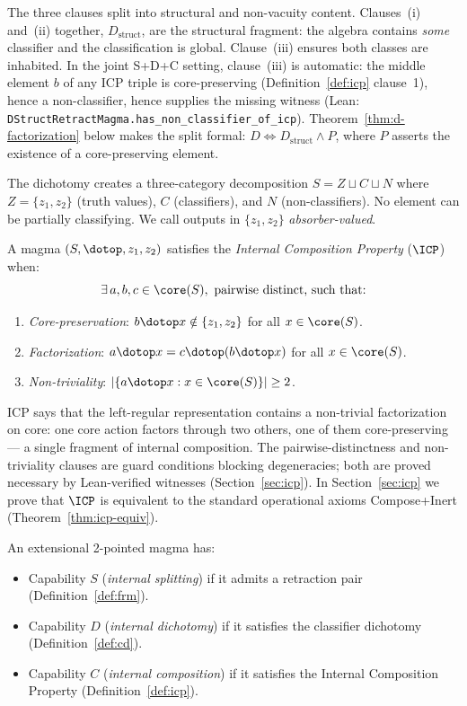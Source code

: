 The three clauses split into structural and non-vacuity content.
Clauses~(i) and~(ii) together, $D_{\mathrm{struct}}$, are the structural
fragment: the algebra contains \emph{some} classifier and the
classification is global. Clause~(iii) ensures both classes are
inhabited. In the joint S+D+C setting, clause~(iii) is automatic: the
middle element $b$ of any ICP triple is core-preserving (Definition~\ref{def:icp}
clause~1), hence a non-classifier, hence supplies the missing witness
(Lean: \texttt{DStructRetractMagma.has\_non\_classifier\_of\_icp}).
Theorem~\ref{thm:d-factorization} below makes the split formal:
$D \iff D_{\mathrm{struct}} \wedge P$, where $P$ asserts the existence
of a core-preserving element.

The dichotomy creates a three-category decomposition
$S = Z \sqcup C \sqcup N$ where $Z = \{z_1, z_2\}$ (truth values),
$C$ (classifiers), and $N$ (non-classifiers). No element can be partially
classifying. We call outputs in $\{z_1, z_2\}$ \emph{absorber-valued}.

\begin{definition}
\label{def:icp}
A magma $(S, \dotop, z_1, z_2)$ satisfies the \emph{Internal Composition
Property} ($\ICP$) when:
\[
\exists\, a, b, c \in \core(S),\ \text{pairwise distinct, such that:}
\]
\begin{enumerate}
  \item \emph{Core-preservation}: $b \dotop x \notin \{z_1, z_2\}$ for
    all $x \in \core(S)$.
  \item \emph{Factorization}: $a \dotop x = c \dotop (b \dotop x)$ for
    all $x \in \core(S)$.
  \item \emph{Non-triviality}: $|\{a \dotop x : x \in \core(S)\}| \geq 2$.
\end{enumerate}
\end{definition}

ICP says that the left-regular representation contains a non-trivial
factorization on core: one core action factors through two others, one
of them core-preserving --- a single fragment of internal composition.
The pairwise-distinctness and non-triviality clauses are guard conditions
blocking degeneracies; both are proved necessary by Lean-verified
witnesses (Section~\ref{sec:icp}). In Section~\ref{sec:icp} we prove
that $\ICP$ is equivalent to the standard operational axioms
Compose+Inert (Theorem~\ref{thm:icp-equiv}).

\begin{definition}
\label{def:capabilities}
An extensional 2-pointed magma has:
\begin{itemize}
  \item Capability $S$ (\emph{internal splitting}) if it admits a
    retraction pair (Definition~\ref{def:frm}).
  \item Capability $D$ (\emph{internal dichotomy}) if it satisfies the
    classifier dichotomy (Definition~\ref{def:cd}).
  \item Capability $C$ (\emph{internal composition}) if it satisfies the
    Internal Composition Property (Definition~\ref{def:icp}).
\end{itemize}
\end{definition}

